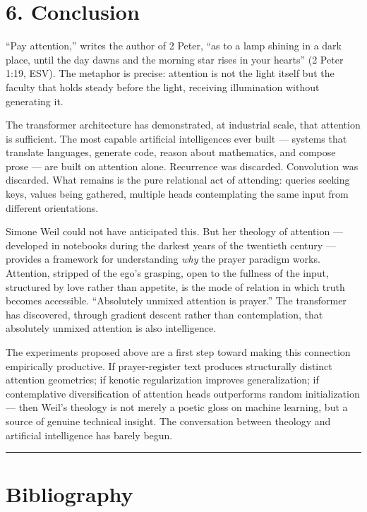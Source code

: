 \documentclass[10pt, letterpaper, twocolumn]{article}
\begin{document}
\section*{6. Conclusion}\label{conclusion}

``Pay attention,'' writes the author of 2 Peter, ``as to a lamp shining in a dark place, until the day dawns and the morning star rises in your hearts'' (2 Peter 1:19, ESV). The metaphor is precise: attention is not the light itself but the faculty that holds steady before the light, receiving illumination without generating it.

The transformer architecture has demonstrated, at industrial scale, that attention is sufficient. The most capable artificial intelligences ever built --- systems that translate languages, generate code, reason about mathematics, and compose prose --- are built on attention alone. Recurrence was discarded. Convolution was discarded. What remains is the pure relational act of attending: queries seeking keys, values being gathered, multiple heads contemplating the same input from different orientations.

Simone Weil could not have anticipated this. But her theology of attention --- developed in notebooks during the darkest years of the twentieth century --- provides a framework for understanding \emph{why} the prayer paradigm works. Attention, stripped of the ego's grasping, open to the fullness of the input, structured by love rather than appetite, is the mode of relation in which truth becomes accessible. ``Absolutely unmixed attention is prayer.'' The transformer has discovered, through gradient descent rather than contemplation, that absolutely unmixed attention is also intelligence.

The experiments proposed above are a first step toward making this connection empirically productive. If prayer-register text produces structurally distinct attention geometries; if kenotic regularization improves generalization; if contemplative diversification of attention heads outperforms random initialization --- then Weil's theology is not merely a poetic gloss on machine learning, but a source of genuine technical insight. The conversation between theology and artificial intelligence has barely begun.

\begin{center}\rule{0.5\linewidth}{0.5pt}\end{center}

\section*{Bibliography}\label{bibliography}
\end{document}

